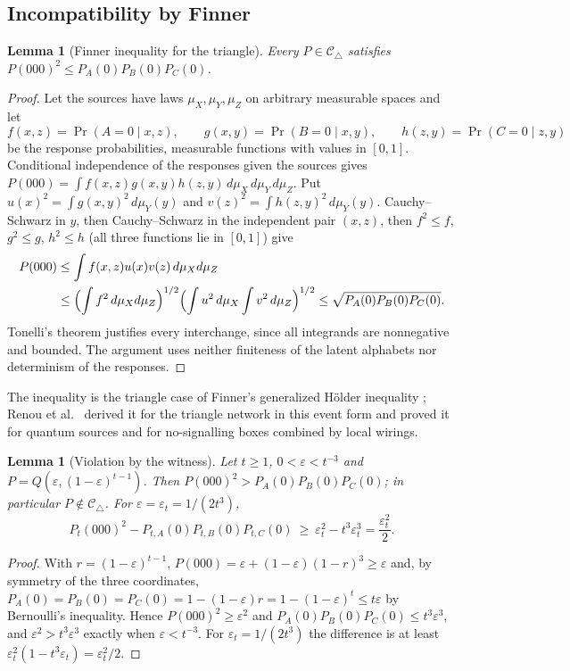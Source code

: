 \documentclass[11pt]{article}
\theoremstyle{plain}
\newtheorem{lemma}[theorem]{Lemma}
\theoremstyle{definition}
\newcommand{\Ctri}{\mathcal C_{\triangle}}
\newcommand{\eps}{\varepsilon}
\begin{document}
\subsection{Incompatibility by Finner}\label{sec:incompat}

\begin{lemma}[Finner inequality for the triangle]\label{lem:finner}
Every $P\in\Ctri$ satisfies $P(000)^2\le P_A(0)P_B(0)P_C(0)$.
\end{lemma}
\begin{proof}
Let the sources have laws $\mu_X,\mu_Y,\mu_Z$ on arbitrary measurable spaces and let
\[
f(x,z)=\Pr(A=0\mid x,z),\qquad g(x,y)=\Pr(B=0\mid x,y),\qquad h(z,y)=\Pr(C=0\mid z,y)
\]
be the response probabilities, measurable functions with values in $[0,1]$. Conditional independence of the responses given the sources gives $P(000)=\int f(x,z)g(x,y)h(z,y)\,d\mu_X\,d\mu_Y\,d\mu_Z$. Put $u(x)^2=\int g(x,y)^2\,d\mu_Y(y)$ and $v(z)^2=\int h(z,y)^2\,d\mu_Y(y)$. Cauchy--Schwarz in $y$, then Cauchy--Schwarz in the independent pair $(x,z)$, then $f^2\le f$, $g^2\le g$, $h^2\le h$ (all three functions lie in $[0,1]$) give
\[
\begin{aligned}
P(000)&\le\int f(x,z)u(x)v(z)\,d\mu_Xd\mu_Z\\
&\le\Bigl(\int f^2\,d\mu_Xd\mu_Z\Bigr)^{1/2}\Bigl(\int u^2\,d\mu_X\int v^2\,d\mu_Z\Bigr)^{1/2}
\le\sqrt{P_A(0)P_B(0)P_C(0)}.
\end{aligned}
\]
Tonelli's theorem justifies every interchange, since all integrands are nonnegative and bounded. The argument uses neither finiteness of the latent alphabets nor determinism of the responses.
\end{proof}

The inequality is the triangle case of Finner's generalized Hölder inequality \cite{Finner1992}; Renou et al.\ \cite{Renou2019} derived it for the triangle network in this event form and proved it for quantum sources and for no-signalling boxes combined by local wirings.

\begin{lemma}[Violation by the witness]\label{lem:violation}
Let $t\ge1$, $0<\eps<t^{-3}$ and $P=Q(\eps,(1-\eps)^{t-1})$. Then $P(000)^2>P_A(0)P_B(0)P_C(0)$; in particular $P\notin\Ctri$. For $\eps=\eps_t=1/(2t^3)$,
\[
P_t(000)^2-P_{t,A}(0)P_{t,B}(0)P_{t,C}(0)\ \ge\ \eps_t^2-t^3\eps_t^3=\frac{\eps_t^2}{2}.
\]
\end{lemma}
\begin{proof}
With $r=(1-\eps)^{t-1}$, $P(000)=\eps+(1-\eps)(1-r)^3\ge\eps$ and, by symmetry of the three coordinates, $P_A(0)=P_B(0)=P_C(0)=1-(1-\eps)r=1-(1-\eps)^t\le t\eps$ by Bernoulli's inequality. Hence $P(000)^2\ge\eps^2$ and $P_A(0)P_B(0)P_C(0)\le t^3\eps^3$, and $\eps^2>t^3\eps^3$ exactly when $\eps<t^{-3}$. For $\eps_t=1/(2t^3)$ the difference is at least $\eps_t^2(1-t^3\eps_t)=\eps_t^2/2$.
\end{proof}
\end{document}
